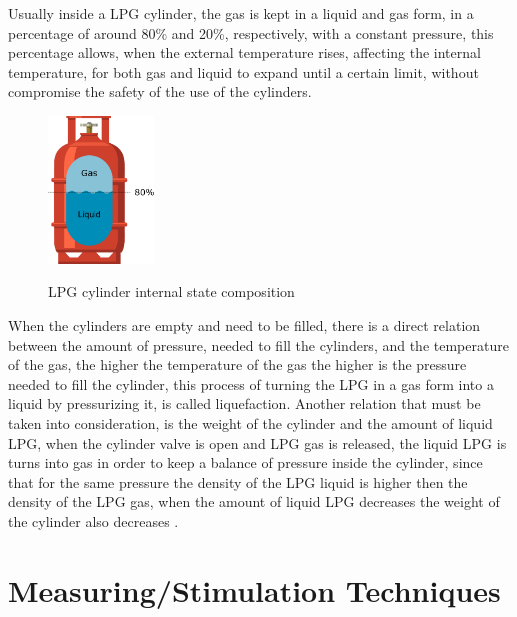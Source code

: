 Usually inside a LPG cylinder, the gas is kept in a liquid and gas form, in a percentage of around 80\% and 20\%, respectively, with a constant pressure, this percentage allows, when the external temperature rises, affecting the internal temperature, for both gas and liquid to expand until a certain limit, without compromise the safety of the use of the cylinders.
\begin{figure}[!htb]
    \centering
    \includegraphics[width=0.25\textwidth]{Chapters/2CHP/Diagrams/bottleBaseliqGas.eps}
    \caption{LPG cylinder internal state composition}{}
    \label{fig:intcomplpg}
\end{figure}

When the cylinders are empty and need to be filled, there is a direct relation between the amount of pressure, needed to fill the cylinders, and the temperature of the gas, the higher the temperature of the gas the higher is the pressure needed to fill the cylinder, this process of turning the LPG in a gas form into a liquid by pressurizing it, is called liquefaction. Another relation that must be taken into consideration, is the weight of the cylinder and the amount of liquid LPG, when the cylinder valve is open and LPG gas is released, the liquid LPG is turns into gas in order to keep a balance of pressure inside the cylinder, since that for the same pressure the density of the LPG liquid is higher then the density of the LPG gas, when the amount of liquid LPG decreases the weight of the cylinder also decreases \cite{WhatAreProperties} \cite{PropaneDensitySpecific}.


\section{Measuring/Stimulation Techniques}\label{sec:measStim}
